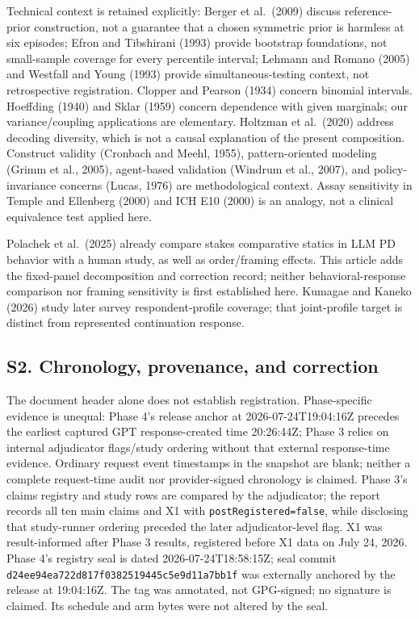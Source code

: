 \documentclass[11pt]{article}
\begin{document}
Technical context is retained explicitly: Berger et al.~(2009) discuss
reference-prior construction, not a guarantee that a chosen symmetric
prior is harmless at six episodes; Efron and Tibshirani (1993) provide
bootstrap foundations, not small-sample coverage for every percentile
interval; Lehmann and Romano (2005) and Westfall and Young (1993)
provide simultaneous-testing context, not retrospective registration.
Clopper and Pearson (1934) concern binomial intervals. Hoeffding (1940)
and Sklar (1959) concern dependence with given marginals; our
variance/coupling applications are elementary. Holtzman et al.~(2020)
address decoding diversity, which is not a causal explanation of the
present composition. Construct validity (Cronbach and Meehl, 1955),
pattern-oriented modeling (Grimm et al., 2005), agent-based validation
(Windrum et al., 2007), and policy-invariance concerns (Lucas, 1976) are
methodological context. Assay sensitivity in Temple and Ellenberg (2000)
and ICH E10 (2000) is an analogy, not a clinical equivalence test
applied here.

Polachek et al.~(2025) already compare stakes comparative statics in LLM
PD behavior with a human study, as well as order/framing effects. This
article adds the fixed-panel decomposition and correction record;
neither behavioral-response comparison nor framing sensitivity is first
established here. Kumagae and Kaneko (2026) study later survey
respondent-profile coverage; that joint-profile target is distinct from
represented continuation response.

\subsection{S2. Chronology, provenance, and
correction}\label{s2.-chronology-provenance-and-correction}

The document header alone does not establish registration.
Phase-specific evidence is unequal: Phase 4's release anchor at
2026-07-24T19:04:16Z precedes the earliest captured GPT response-created
time 20:26:44Z; Phase 3 relies on internal adjudicator flags/study
ordering without that external response-time evidence. Ordinary request
event timestamps in the snapshot are blank; neither a complete
request-time audit nor provider-signed chronology is claimed. Phase 3's
claims registry and study rows are compared by the adjudicator; the
report records all ten main claims and X1 with
\texttt{postRegistered=false}, while disclosing that study-runner
ordering preceded the later adjudicator-level flag. X1 was
result-informed after Phase 3 results, registered before X1 data on July
24, 2026. Phase 4's registry seal is dated 2026-07-24T18:58:15Z; seal
commit \nolinkurl{d24ee94ea722d817f0382519445c5e9d11a7bb1f} was
externally anchored by the release at 19:04:16Z. The tag was annotated,
not GPG-signed; no signature is claimed. Its schedule and arm bytes were
not altered by the seal.
\end{document}
